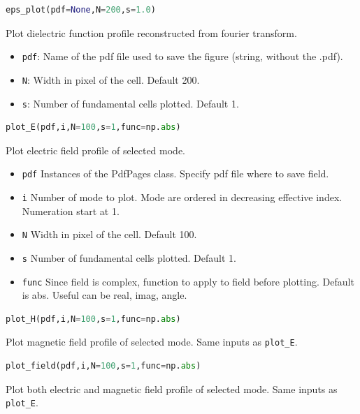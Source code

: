 \documentclass[a4paper,10pt]{report}
\begin{document}
\begin{lstlisting}[language=Python,basicstyle=\ttfamily\Large]
eps_plot(pdf=None,N=200,s=1.0)
\end{lstlisting}
Plot dielectric function profile reconstructed from fourier transform.
\begin{itemize}[noitemsep,topsep=0pt,parsep=0pt,partopsep=0pt]
\item \texttt{pdf}: Name of the pdf file used to save the figure (string, without the .pdf).
\item \texttt{N}: Width in pixel of the cell. Default 200.
\item \texttt{s}: Number of fundamental cells plotted. Default 1.
\end{itemize}

\begin{lstlisting}[language=Python,basicstyle=\ttfamily\Large]
plot_E(pdf,i,N=100,s=1,func=np.abs)
\end{lstlisting}
Plot electric field profile of selected mode.
\begin{itemize}[noitemsep,topsep=0pt,parsep=0pt,partopsep=0pt]
\item \texttt{pdf} Instances of the PdfPages class. Specify pdf file where to save field.
\item \texttt{i} Number of mode to plot. Mode are ordered in decreasing effective index. Numeration start at 1.
\item \texttt{N} Width in pixel of the cell. Default 100.
\item \texttt{s} Number of fundamental cells plotted. Default 1.
\item \texttt{func} Since field is complex, function to apply to field before plotting. Default is abs. Useful can be real, imag, angle. 
\end{itemize}

\begin{lstlisting}[language=Python,basicstyle=\ttfamily\Large]
plot_H(pdf,i,N=100,s=1,func=np.abs)
\end{lstlisting}
Plot magnetic field profile of selected mode. Same inputs as \texttt{plot\_E}.

\begin{lstlisting}[language=Python,basicstyle=\ttfamily\Large]
plot_field(pdf,i,N=100,s=1,func=np.abs)
\end{lstlisting}
Plot both electric and magnetic field profile of selected mode. Same inputs as \texttt{plot\_E}. 
\end{document}
